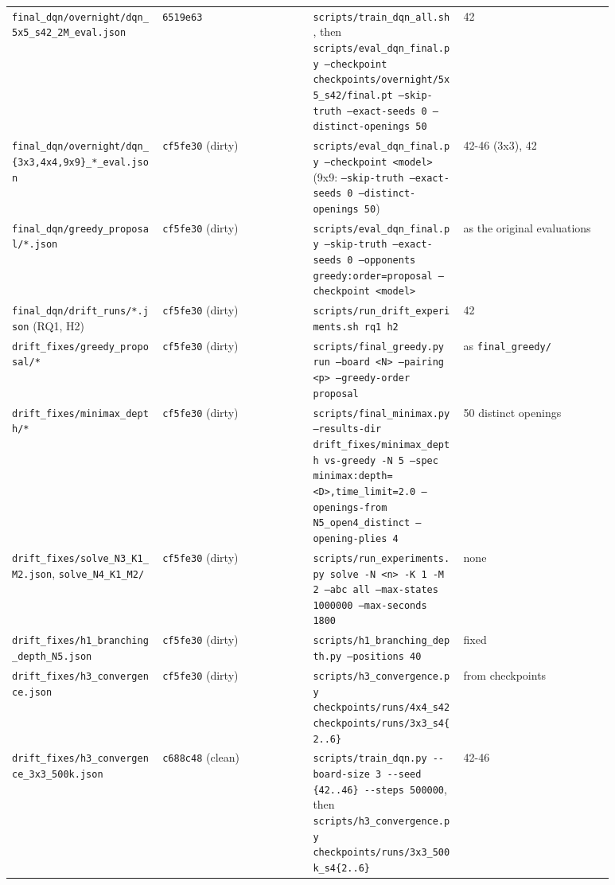 \documentclass[11pt]{article}
\begin{document}
\begin{center}
\begin{longtable}{p{0.22\linewidth}p{0.22\linewidth}p{0.22\linewidth}p{0.22\linewidth}}
\texttt{final\_dqn/overnight/dqn\_5x5\_s42\_2M\_eval.json} & \texttt{6519e63} & \texttt{scripts/train\_dqn\_all.sh}, then \texttt{scripts/eval\_dqn\_final.py --checkpoint checkpoints/overnight/5x5\_s42/final.pt --skip-truth --exact-seeds 0 --distinct-openings 50} & 42 \\
\texttt{final\_dqn/overnight/dqn\_\{3x3,4x4,9x9\}\_*\_eval.json} & \texttt{cf5fe30} (dirty) & \texttt{scripts/eval\_dqn\_final.py --checkpoint <model>} (9x9: \texttt{--skip-truth --exact-seeds 0 --distinct-openings 50}) & 42-46 (3x3), 42 \\
\texttt{final\_dqn/greedy\_proposal/*.json} & \texttt{cf5fe30} (dirty) & \texttt{scripts/eval\_dqn\_final.py --skip-truth --exact-seeds 0 --opponents greedy:order=proposal --checkpoint <model>} & as the original evaluations \\
\texttt{final\_dqn/drift\_runs/*.json} (RQ1, H2) & \texttt{cf5fe30} (dirty) & \texttt{scripts/run\_drift\_experiments.sh rq1 h2} & 42 \\
\texttt{drift\_fixes/greedy\_proposal/*} & \texttt{cf5fe30} (dirty) & \texttt{scripts/final\_greedy.py run --board <N> --pairing <p> --greedy-order proposal} & as \texttt{final\_greedy/} \\
\texttt{drift\_fixes/minimax\_depth/*} & \texttt{cf5fe30} (dirty) & \texttt{scripts/final\_minimax.py --results-dir drift\_fixes/minimax\_depth vs-greedy -N 5 --spec minimax:depth=<D>,time\_limit=2.0 --openings-from N5\_open4\_distinct --opening-plies 4} & 50 distinct openings \\
\texttt{drift\_fixes/solve\_N3\_K1\_M2.json}, \texttt{solve\_N4\_K1\_M2/} & \texttt{cf5fe30} (dirty) & \texttt{scripts/run\_experiments.py solve -N <n> -K 1 -M 2 --abc all --max-states 1000000 --max-seconds 1800} & none \\
\texttt{drift\_fixes/h1\_branching\_depth\_N5.json} & \texttt{cf5fe30} (dirty) & \texttt{scripts/h1\_branching\_depth.py --positions 40} & fixed \\
\texttt{drift\_fixes/h3\_convergence.json} & \texttt{cf5fe30} (dirty) & \texttt{scripts/h3\_convergence.py checkpoints/runs/4x4\_s42 checkpoints/runs/3x3\_s4\{2..6\}} & from checkpoints \\
\texttt{drift\_fixes/h3\_convergence\_3x3\_500k.json} & \texttt{c688c48} (clean) & \texttt{scripts/train\_dqn.py -{}-board-size 3 -{}-seed \{42..46\} -{}-steps 500000}, then \texttt{scripts/h3\_convergence.py checkpoints/runs/3x3\_500k\_s4\{2..6\}} & 42-46 \\
\bottomrule
\end{longtable}
\end{center}
\end{document}
